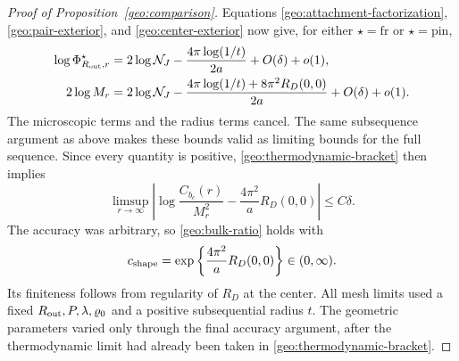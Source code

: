 \begin{proof}[Proof of Proposition~\ref{geo:comparison}]
Equations \eqref{geo:attachment-factorization},
\eqref{geo:pair-exterior}, and \eqref{geo:center-exterior} now give,
for either \(\star=\mathrm{fr}\) or \(\star=\mathrm{pin}\),
\begin{align*}
 \log \Phi_{R_{\rm out},r}^{\star}
    &=2\log\mathcal N_J-\frac{4\pi\log(1/t)}{2a}
                                      +O(\delta)+o(1),\\
 2\log M_r
    &=2\log\mathcal N_J-
          \frac{4\pi\log(1/t)+8\pi^2R_D(0,0)}{2a}
                                      +O(\delta)+o(1).
\end{align*}
The microscopic terms and the radius terms cancel.  The same
subsequence argument as above makes these bounds valid as limiting
bounds for the full sequence.  Since every quantity is positive,
\eqref{geo:thermodynamic-bracket} then implies
\[
 \limsup_{r\to\infty}\left|
       \log\frac{C_{b_c}(r)}{M_r^2}-\frac{4\pi^2}{a}R_D(0,0)\right|
       \le C\delta.
\]
The accuracy was arbitrary, so \eqref{geo:bulk-ratio} holds with
\begin{equation}\label{geo:shape-constant}
             c_{\rm shape}=\exp\left\{\frac{4\pi^2}{a}R_D(0,0)\right\}
                            \in(0,\infty).
\end{equation}
Its finiteness follows from regularity of \(R_D\) at the center.
All mesh limits used a fixed \(R_{\rm out},P,\lambda,\varrho_0\) and a positive
subsequential radius \(t\).  The geometric parameters varied only
through the final accuracy argument, after the thermodynamic limit
had already been taken in \eqref{geo:thermodynamic-bracket}.
\end{proof}
